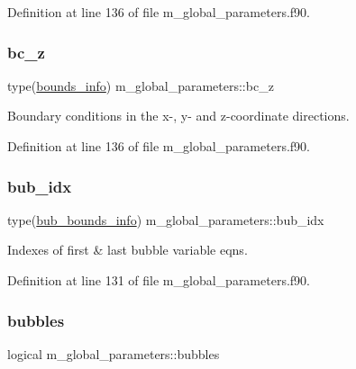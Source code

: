 Definition at line 136 of file m\+\_\+global\+\_\+parameters.\+f90.

\mbox{\label{namespacem__global__parameters_a6769808569174ff0eef096e958889837}} 
\subsubsection{\texorpdfstring{bc\+\_\+z}{bc\_z}}
{\footnotesize\ttfamily type(\hyperlink{structm__derived__types_1_1bounds__info}{bounds\+\_\+info}) m\+\_\+global\+\_\+parameters\+::bc\+\_\+z}



Boundary conditions in the x-\/, y-\/ and z-\/coordinate directions. 



Definition at line 136 of file m\+\_\+global\+\_\+parameters.\+f90.

\mbox{\label{namespacem__global__parameters_a9a425d1bd91d1765043adf8410b98bf7}} 
\subsubsection{\texorpdfstring{bub\+\_\+idx}{bub\_idx}}
{\footnotesize\ttfamily type(\hyperlink{structm__derived__types_1_1bub__bounds__info}{bub\+\_\+bounds\+\_\+info}) m\+\_\+global\+\_\+parameters\+::bub\+\_\+idx}



Indexes of first \& last bubble variable eqns. 



Definition at line 131 of file m\+\_\+global\+\_\+parameters.\+f90.

\mbox{\label{namespacem__global__parameters_a4a22ed160838f8fbe6bd506f334b8815}} 
\subsubsection{\texorpdfstring{bubbles}{bubbles}}
{\footnotesize\ttfamily logical m\+\_\+global\+\_\+parameters\+::bubbles}



